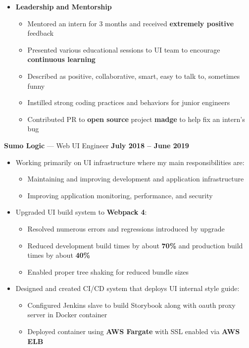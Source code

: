 \documentclass[10pt, oneside]{letter}
\begin{document}
\begin{adjustwidth}{0.1in}{0pt}
\begin{itemize}
\begin{itemize}
              \item{\textbf{Leadership and Mentorship}}
                \begin{itemize}
                  \item{Mentored an intern for 3 months and received \textbf{extremely positive} feedback}
                  \item{Presented various educational sessions to UI team to encourage \textbf{continuous learning}}
                  \item{Described as positive, collaborative, smart, easy to talk to, sometimes funny}
                  \item{Instilled strong coding practices and behaviors for junior engineers}
                  \item{Contributed PR to \textbf{open source} project \textbf{madge} to help fix an intern's bug}
                \end{itemize}
            \end{itemize}
          \textbf{Sumo Logic} --- Web UI Engineer \hfill \textbf{July 2018 -- June 2019}
            \begin{itemize}
              \item{
                Working primarily on UI infrastructure where my main
                responsibilities are:
              }
                \begin{itemize}
                  \item{Maintaining and improving development and application infrastructure}
                  \item{Improving application monitoring, performance, and security}
                \end{itemize}
              \item{Upgraded UI build system to \textbf{Webpack 4}:}
                \begin{itemize}
                  \item{Resolved numerous errors and regressions introduced by upgrade}
                  \item{Reduced development build times by about \textbf{70\%} and production build times by about \textbf{40\%}}
                  \item{Enabled proper tree shaking for reduced bundle sizes}
                \end{itemize}

              \item{Designed and created CI/CD system that deploys UI internal style guide:}
                \begin{itemize}
                  \item{Configured Jenkins slave to build Storybook along with oauth proxy server in Docker container}
                  \item{Deployed container using \textbf{AWS Fargate} with SSL enabled via \textbf{AWS ELB}}
                \end{itemize}


\end{itemize}
\end{itemize}
\end{adjustwidth}
\end{document}
